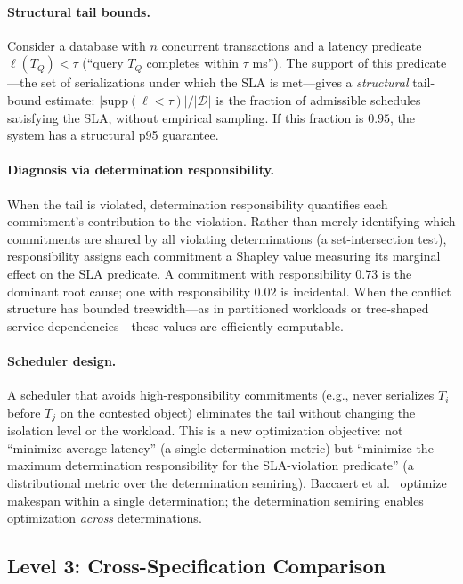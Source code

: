 \paragraph{Structural tail bounds.}
Consider a database with $n$ concurrent transactions and a latency
predicate $\ell(T_Q) < \tau$ (``query $T_Q$ completes within $\tau$
ms'').
The support of this predicate---the set of serializations under which
the SLA is met---gives a \emph{structural} tail-bound estimate:
$|\mathrm{supp}(\ell < \tau)| / |\mathcal{D}|$ is the fraction of
admissible schedules satisfying the SLA, without empirical sampling.
If this fraction is $0.95$, the system has a structural p95 guarantee.

\paragraph{Diagnosis via determination responsibility.}
When the tail is violated, determination responsibility
quantifies each commitment's contribution to the violation.
Rather than merely identifying which commitments are shared by all
violating determinations (a set-intersection test), responsibility
assigns each commitment a Shapley value measuring its marginal effect
on the SLA predicate.
A commitment with responsibility $0.73$ is the dominant root cause;
one with responsibility $0.02$ is incidental.
When the conflict structure has bounded treewidth---as in partitioned
workloads or tree-shaped service dependencies---these values are
efficiently computable.

\paragraph{Scheduler design.}
A scheduler that avoids high-responsibility commitments (e.g., never
serializes $T_i$ before $T_j$ on the contested object) eliminates the
tail without changing the isolation level or the workload.
This is a new optimization objective: not ``minimize average latency''
(a single-determination metric) but ``minimize the maximum
determination responsibility for the SLA-violation predicate''
(a distributional metric over the determination semiring).
Baccaert et al.~\cite{baccaert2026makespan} optimize makespan within a
single determination; the determination semiring enables optimization
\emph{across} determinations.

\subsection{Level 3: Cross-Specification Comparison}

